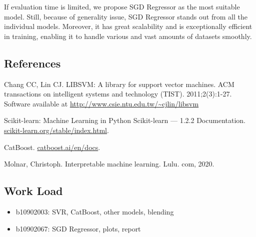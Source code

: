 \documentclass[10pt,letterpaper]{article}
\begin{document}
If evaluation time is limited, we propose SGD Regressor as the most suitable model. Still, because of generality issue, SGD Regressor stands out from all the individual models. Moreover, it has great scalability and is exceptionally efficient in training, enabling it to handle various and vast amounts of datasets smoothly. 

\subsection*{References}

\begin{enumerate}[label={[\arabic*]}]
	\item Chang CC, Lin CJ. LIBSVM: A library for support vector machines. ACM transactions on intelligent systems and technology (TIST). 2011;2(3):1-27. Software available at \url{http://www.csie.ntu.edu.tw/~cjlin/libsvm}
	\item Scikit-learn: Machine Learning in Python Scikit-learn — 1.2.2 Documentation. \url{scikit-learn.org/stable/index.html}.
	\item CatBoost. \url{catboost.ai/en/docs}.
	\item Molnar, Christoph. Interpretable machine learning. Lulu. com, 2020.
\end{enumerate}

\subsection*{Work Load}
\begin{itemize}
	\item b10902003: SVR, CatBoost, other models, blending
	\item b10902067: SGD Regressor, plots, report
\end{itemize}
\end{document}
